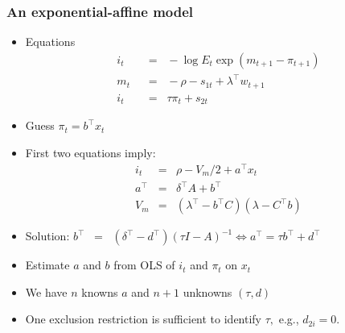 \documentclass[handout]{beamer}
\begin{document}
\begin{frame}
\frametitle{An exponential-affine model}
\begin{footnotesize}
\begin{itemize} %
\item Equations %
\begin{align*}
    i_t &\;\;=\;\; - \log E_t \exp(m_{t+1}-\pi_{t+1}) \tag{Euler/Fisher equation} \\
        m_t &\;\;=\;\;  -\rho - s_{1t} + \lambda^\top w_{t+1}   \tag{Pricing kernel}\\
    i_t &\;\;=\;\;  \tau \pi_{t} + s_{2t} \tag{Taylor rule}
\end{align*}
\pause
\item Guess $\pi_t=b^\top x_t$
\item First two equations imply:
\begin{eqnarray*}
   i_t &=&  \rho - V_m/2  + a^\top x_t \\
    a^\top &=& \delta^\top A + b^\top  \\
    V_m     &=& (\lambda^\top - b^\top C)(\lambda - C^\top b)
\end{eqnarray*}
\item Solution: $b^\top \;\;=\;\;  (\delta^\top - d^\top) (\tau I -  A )^{-1}  \Leftrightarrow     a^\top = \tau b^\top + d^\top$
\item Estimate $a$ and $b$ from OLS of $i_t$ and $\pi_t$ on $x_t$
 \item We have $n$ knowns $a$ and $n+1$ unknowns  $(\tau,d)$
 \item One exclusion restriction is sufficient to identify $\tau,$ e.g., $d_{2i}=0.$
\end{itemize}
\end{footnotesize}
\end{frame}
\end{document}
